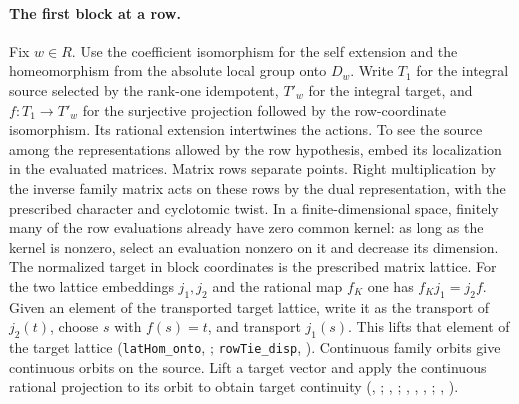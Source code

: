 \paragraph{The first block at a row.}
Fix $w\in R$. Use the coefficient isomorphism for the self extension
and the homeomorphism from the absolute local group onto $D_w$.
Write $T_1$ for the integral source selected by the rank-one
idempotent, $T'_w$ for the integral target, and $f:T_1\to T'_w$ for the
surjective projection followed by the row-coordinate isomorphism.
Its rational extension intertwines the actions. To see the source
among the representations allowed by the row hypothesis, embed its
localization in the evaluated matrices. Matrix rows separate points.
Right multiplication by the inverse family matrix acts on these rows
by the dual representation, with the prescribed character and cyclotomic
twist. In a finite-dimensional space, finitely many of the row evaluations
already have zero common kernel: as long as the kernel is nonzero, select
an evaluation nonzero on it and decrease its dimension.
The normalized target in block coordinates is the prescribed matrix
lattice. For the two lattice embeddings $j_1,j_2$ and the rational
map $f_K$ one has $f_Kj_1=j_2f$. Given an element of the transported
target lattice, write it as the transport of $j_2(t)$, choose $s$
with $f(s)=t$, and transport $j_1(s)$. This lifts that element of
the target lattice (\nolinkurl{latHom_onto},
;
\nolinkurl{rowTie_disp},
).
Continuous family orbits give continuous orbits on the source. Lift a
target vector and apply the continuous rational projection to its orbit
to obtain target continuity
(, ;
, ;
, , ,
;
, ).

